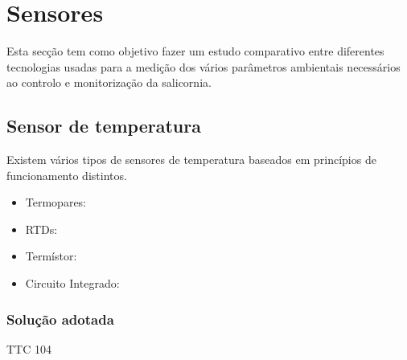 \newpage
\section{Sensores}


Esta secção tem como objetivo fazer um estudo comparativo entre diferentes tecnologias
usadas para a medição dos vários parâmetros ambientais necessários ao controlo e monitorização da salicornia. 

\subsection{Sensor de temperatura }
Existem vários tipos de sensores de temperatura baseados em princípios de funcionamento distintos. 


\begin{itemize}
	\item Termopares: 
	\item RTDs:
	\item Termístor: 
	\item Circuito Integrado: 
\end{itemize}




\subsubsection{Solução adotada}


TTC 104

